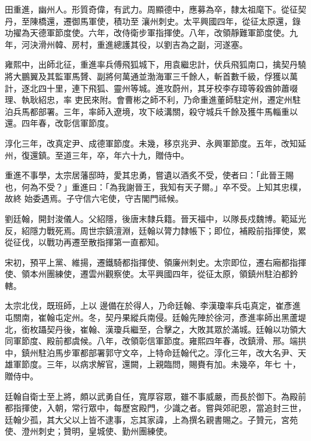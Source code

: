 \begin{pinyinscope}
 田重進，幽州人。形質奇偉，有武力。周顯德中，應募為卒，隸太祖麾下。從征契丹，至陳橋還，遷御馬軍使，積功至
 瀼州刺史。太平興國四年，從征太原還，錄功擢為天德軍節度使。六年，改侍衛步軍指揮使。八年，改領靜難軍節度使。九年，河決滑州韓、房村，重進總護其役，以劉吉為之副，河遂塞。



 雍熙中，出師北征，重進率兵傅飛狐城下，用袁繼忠計，伏兵飛狐南口，擒契丹驍將大鵬翼及其監軍馬贇、副將何萬通並渤海軍三千餘人，斬首數千級，俘獲以萬計，逐北四十里，連下飛狐、靈州等城。進攻蔚州，其牙校李存璋等殺酋帥蕭啜理、執耿紹忠，率
 吏民來附。會曹彬之師不利，乃命重進董師駐定州，遷定州駐泊兵馬都部署。三年，率師入遼境，攻下岐溝關，殺守城兵千餘及獲牛馬輜重以還。四年春，改彰信軍節度。



 淳化三年，改真定尹、成德軍節度。未幾，移京兆尹、永興軍節度。五年，改知延州，復還鎮。至道三年，卒，年六十九，贈侍中。



 重進不事學，太宗居藩邸時，愛其忠勇，嘗遺以酒炙不受，使者曰：「此晉王賜也，何為不受？」重進曰：「為我謝晉王，我知有天子爾。」卒不受。上知其忠樸，故終
 始委遇焉。子守信六宅使，守吉閣門祗候。



 劉廷翰，開封浚儀人。父紹隱，後唐末隸兵籍。晉天福中，以隊長戍魏博。範延光反，紹隱力戰死焉。周世宗鎮澶淵，廷翰以膂力隸帳下；即位，補殿前指揮使，累從征伐，以戰功再遷至散指揮第一直都知。



 宋初，預平上黨、維揚，遷鐵騎都指揮使、領廉州刺史。太宗即位，遷右廂都指揮使、領本州團練使，遷雲州觀察使。太平興國四年，從征太原，領鎮州駐泊都鈐轄。



 太宗北伐，既班師，上以
 邊備在於得人，乃命廷翰、李漢瓊率兵屯真定，崔彥進屯關南，崔翰屯定州。冬，契丹果縱兵南侵。廷翰先陣於徐河，彥進率師出黑蘆堤北，銜枚躡契丹後，崔翰、漢瓊兵繼至，合擊之，大敗其眾於滿城。廷翰以功領大同軍節度、殿前都虞候。八年，改領彰信軍節度。雍熙四年春，改鎮滑、邢。端拱中，鎮州駐泊馬步軍都部署郭守文卒，上特命廷翰代之。淳化三年，改大名尹、天雄軍節度。三年，以病求解官，還闕，上親臨問，賜賚有加。未幾卒，年七
 十，贈侍中。



 廷翰自衛士至上將，頗以武勇自任，寬厚容眾，雖不事威嚴，而長於御下。為殿前都指揮使，入朝，常行眾中，每歷宮殿門，少識之者。嘗與郊祀恩，當追封三世，廷翰少孤，其大父以上皆不逮事，忘其家諱，上為撰名親書賜之。子贊元，宮苑使、澄州刺史；贊明，皇城使、勤州團練使。




\end{pinyinscope}

